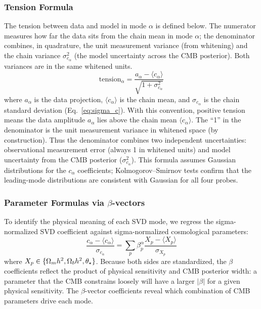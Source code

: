 \subsubsection{Tension Formula}

The tension between data and model in mode $\alpha$ is defined below. The numerator measures how far the data sits from the chain mean in mode $\alpha$; the denominator combines, in quadrature, the unit measurement variance (from whitening) and the chain variance $\sigma_{c_\alpha}^2$ (the model uncertainty across the CMB posterior). Both variances are in the same whitened units.
\begin{equation}
\mathrm{tension}_\alpha = \frac{a_\alpha - \langle c_\alpha \rangle}{\sqrt{1 + \sigma_{c_\alpha}^2}}
\label{eq:tension}
\end{equation}
where $a_\alpha$ is the data projection, $\langle c_\alpha \rangle$ is the chain mean, and $\sigma_{c_\alpha}$ is the chain standard deviation (Eq.~\ref{eq:sigma_c}). With this convention, positive tension means the data amplitude $a_\alpha$ lies above the chain mean $\langle c_\alpha \rangle$. The ``1'' in the denominator is the unit measurement variance in whitened space (by construction). Thus the denominator combines two independent uncertainties: observational measurement error (always 1 in whitened units) and model uncertainty from the CMB posterior ($\sigma_{c_\alpha}^2$). This formula assumes Gaussian distributions for the $c_\alpha$ coefficients; Kolmogorov--Smirnov tests confirm that the leading-mode distributions are consistent with Gaussian for all four probes.

\subsubsection{Parameter Formulas via $\beta$-vectors}

To identify the physical meaning of each SVD mode, we regress the sigma-normalized SVD coefficient against sigma-normalized cosmological parameters:
\begin{equation}
\frac{c_\alpha - \langle c_\alpha \rangle}{\sigma_{c_\alpha}} = \sum_p \beta_p^\alpha \frac{X_p - \langle X_p \rangle}{\sigma_{X_p}}
\label{eq:beta_vectors}
\end{equation}
where $X_p \in \{\Omega_m h^2, \Omega_b h^2, \theta_\star\}$. Because both sides are standardized, the $\beta$ coefficients reflect the product of physical sensitivity and CMB posterior width: a parameter that the CMB constrains loosely will have a larger $|\beta|$ for a given physical sensitivity. The $\beta$-vector coefficients reveal which combination of CMB parameters drive each mode.

